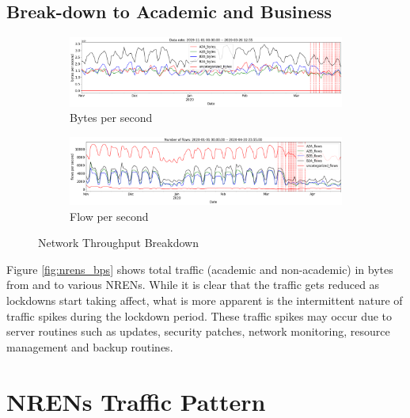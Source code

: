 \documentclass[10pt, journal, letterpaper]{IEEEtran}
\newcommand\linearFigSze{0.48}
\begin{document}
\subsection{Break-down to Academic and Business}
\begin{figure}
    \begin{subfigure}{\linearFigSze\textwidth}
          \centering
          \includegraphics[width=\columnwidth]{img/traffic_trend_bps_AcaVsBus.png}
          \caption{Bytes per second}
          \label{fig:traffic_trend_acaVSbusi_bps}
    \end{subfigure}
    \begin{subfigure}{\linearFigSze\textwidth}
          \centering
          \includegraphics[width=\columnwidth]{img/traffic_trend_fps_AcaVsBus.png}
          \caption{Flow per second}
          \label{fig:traffic_trend_acaVSbusi_fps}
    \end{subfigure}
    \caption{Network Throughput Breakdown}
    \label{fig:network_throughput_breakdown}
\end{figure}

Figure \ref{fig:nrens_bps} shows total traffic (academic and non-academic) in bytes from and to various NRENs. While it is clear that the traffic gets reduced as lockdowns start taking affect, what is more apparent is the intermittent nature of traffic spikes during the lockdown period. These traffic spikes may occur due to server routines such as updates, security patches, network monitoring, resource management and backup routines.

\section{NRENs Traffic Pattern}
\end{document}
